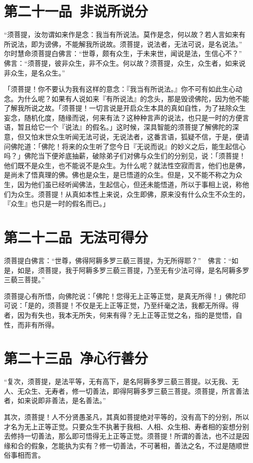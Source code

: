 \documentclass[12pt,twoside,openany]{book}
\newcommand{\kai}[1]{{\CJKfamily{kai}#1}}
\begin{document}
\chapter{第二十一品\ 非说所说分}
“须菩提，汝勿谓如来作是念：我当有所说法。莫作是念，何以故？若人言如来有所说法，即为谤佛，不能解我所说故。须菩提，说法者，无法可说，是名说法。”　尔时慧命须菩提白佛言：“世尊，颇有众生，于未来世，闻说是法，生信心不？”　佛言：“须菩提，彼非众生，非不众生。何以故？须菩提，众生，众生者，如来说非众生，是名众生。”

\kai{「须菩提！你不要认为我有这样的意念：『我当有所说法。』你不可有如此生心动念。为什么呢？如果有人说如来『有所说法』的念头，那是毁谤佛陀，因为他不能了解我所说之故。「须菩提！一切言说是开启众生本具的真如自性，为了袪除众生妄念，随机化度，随缘而说，何来有法？这种种言声的说法，也只是一时的方便言语，暂且给它一个『说法』的假名。」这时候，深具智能的须菩提了解佛陀的深意，但又怕末世众生听闻无法可说，无说法者，这番言语，狐疑不信，于是，便请问佛陀道：「佛陀！将来的众生听了您今日『无说而说』的妙义之后，能生起信心吗？」佛陀当下便斧底抽薪，破除弟子们对佛与众生们的分别见，说：「须菩提！他们既不是众生，也不能说不是众生。为什么呢？就法性空寂而言，他们也是佛，是尚未了悟真理的佛。佛也是众生，是已悟道的众生。但是，又不能不称之为众生，因为他们虽已经听闻佛法，生起信心，但还未能悟道，所以于事相上说，称他们为众生。须菩提！从真如本性上来说，众生即佛，原来没有什么众生不众生的，『众生』也只是一时的假名而已。」}

\chapter{第二十二品\ 无法可得分}
须菩提白佛言：“世尊，佛得阿耨多罗三藐三菩提，为无所得耶？”　佛言：“如是，如是，须菩提，我于阿耨多罗三藐三菩提，乃至无有少法可得，是名阿耨多罗三藐三菩提。”

\kai{须菩提心有所悟，向佛陀说：「佛陀！您得无上正等正觉，是真无所得！」佛陀印可说：「是的，须菩提！不仅是无上正等正觉，乃至纤毫之法，我都无所得。得者，因为有失也，我本无所失，何来有得？无上正等正觉之名，指的是觉悟，自性，而非有所得。}

\chapter{第二十三品\ 净心行善分}
“复次，须菩提，是法平等，无有高下，是名阿耨多罗三藐三菩提。以无我、无人、无众生、无寿者，修一切善法，即得阿耨多罗三藐三菩提。须菩提，所言善法者，如来说即非善法，是名善法。”

\kai{其次，须菩提！人不分贤愚圣凡，其真如菩提绝对平等的，没有高下的分别，所以才名为无上正等正觉。只要众生不执著于我相、人相、众生相、寿者相的妄想分别去修持一切善法，那么即可悟得无上正等正觉。须菩提！所谓的善法，也不过是因缘和合的假象，怎能执为实有？修一切善法，不可著相，善法之名，不过是随顺世俗事相而言。}
\end{document}
